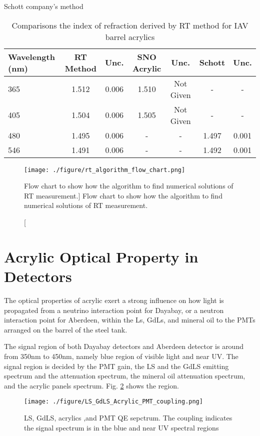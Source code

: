 Schott company's  method

\begin{table}
\centering
\caption{Comparisons the index of refraction derived by RT method for IAV barrel acrylics}
\label{tab:RTMethodResult}
\begin{tabular}{lcccccc}
\hline
Wavelength (nm) & RT Method & Unc. & SNO Acrylic & Unc. & Schott & Unc. \\
\hline
\hline
365 & 1.512 & 0.006 & 1.510 & Not Given & - & - \\
\hline
405 & 1.504 & 0.006 & 1.505 & Not Given & - & - \\
\hline
480 & 1.495 & 0.006 & - & - & 1.497 & 0.001 \\
\hline
546 & 1.491 & 0.006 & - & - & 1.492 & 0.001 \\
\hline
\end{tabular}
\end{table}


\begin{figure}
    \centering
    \texttt{[image: ./figure/rt\_algorithm\_flow\_chart.png]}
    \caption
    [Flow chart to show how the algorithm to find numerical solutions of RT measurement.]
    {Flow chart to show how the algorithm to find numerical solutions of RT measurement.}
    \label{fig:rt_algorithm_flow_chart.png}
    \end{figure}




\section {Acrylic Optical Property in Detectors}

The optical properties of acrylic exert a strong influence on how light is propagated
from a neutrino interaction point for Dayabay, or a neutron interaction point for Aberdeen,
within the Ls, GdLs, and mineral oil to the PMTs arranged on the barrel of the steel tank.

The signal region of both Dayabay detectors and Aberdeen detector
is around from 350nm to 450nm, namely blue region of visible light and near UV.
The signal region is decided by the PMT gain, the LS and the GdLS emitting spectrum and
the attenuation spectrum, the mineral oil attenuation spectrum, and
the acrylic panels spectrum. Fig. \ref{fig:SpectrumCoupling} shows the region.


\begin{figure}
    \centering
    \texttt{[image: ./figure/LS\_GdLS\_Acrylic\_PMT\_coupling.png]}
    \caption{LS, GdLS, acrylics ,and PMT QE sepctrum. The coupling indicates the signal spectrum is in the blue and near UV spectral regions}
    \label{fig:SpectrumCoupling}
    \end{figure}


